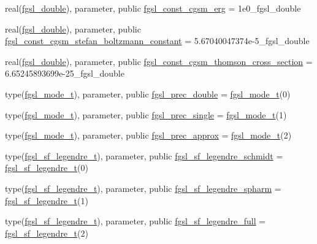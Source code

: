 \begin{DoxyCompactItemize}
real(\hyperlink{namespacefgsl_a9af5113378e0f000eb479d3f90196ddf}{fgsl\+\_\+double}), parameter, public \hyperlink{namespacefgsl_aa30f1017800c569944ad894fff2ae006}{fgsl\+\_\+const\+\_\+cgsm\+\_\+erg} = 1e0\+\_\+fgsl\+\_\+double
\item 
real(\hyperlink{namespacefgsl_a9af5113378e0f000eb479d3f90196ddf}{fgsl\+\_\+double}), parameter, public \hyperlink{namespacefgsl_a7b2b26a4a33ccd17f26be17db533b3ac}{fgsl\+\_\+const\+\_\+cgsm\+\_\+stefan\+\_\+boltzmann\+\_\+constant} = 5.\+67040047374e-\/5\+\_\+fgsl\+\_\+double
\item 
real(\hyperlink{namespacefgsl_a9af5113378e0f000eb479d3f90196ddf}{fgsl\+\_\+double}), parameter, public \hyperlink{namespacefgsl_a1581b093a3a9c09cff62c4bee45c1dcd}{fgsl\+\_\+const\+\_\+cgsm\+\_\+thomson\+\_\+cross\+\_\+section} = 6.\+65245893699e-\/25\+\_\+fgsl\+\_\+double
\item 
type(\hyperlink{structfgsl_1_1fgsl__mode__t}{fgsl\+\_\+mode\+\_\+t}), parameter, public \hyperlink{namespacefgsl_a974fb113c1c5dced8257e1eae0def683}{fgsl\+\_\+prec\+\_\+double} = \hyperlink{structfgsl_1_1fgsl__mode__t}{fgsl\+\_\+mode\+\_\+t}(0)
\item 
type(\hyperlink{structfgsl_1_1fgsl__mode__t}{fgsl\+\_\+mode\+\_\+t}), parameter, public \hyperlink{namespacefgsl_ac6801c472f4316aa060668c157db61bd}{fgsl\+\_\+prec\+\_\+single} = \hyperlink{structfgsl_1_1fgsl__mode__t}{fgsl\+\_\+mode\+\_\+t}(1)
\item 
type(\hyperlink{structfgsl_1_1fgsl__mode__t}{fgsl\+\_\+mode\+\_\+t}), parameter, public \hyperlink{namespacefgsl_ab6d5bd94526f9dacea9ce2293a66c824}{fgsl\+\_\+prec\+\_\+approx} = \hyperlink{structfgsl_1_1fgsl__mode__t}{fgsl\+\_\+mode\+\_\+t}(2)
\item 
type(\hyperlink{structfgsl_1_1fgsl__sf__legendre__t}{fgsl\+\_\+sf\+\_\+legendre\+\_\+t}), parameter, public \hyperlink{namespacefgsl_a8b170e3b737833743129ce02b48f23a9}{fgsl\+\_\+sf\+\_\+legendre\+\_\+schmidt} = \hyperlink{structfgsl_1_1fgsl__sf__legendre__t}{fgsl\+\_\+sf\+\_\+legendre\+\_\+t}(0)
\item 
type(\hyperlink{structfgsl_1_1fgsl__sf__legendre__t}{fgsl\+\_\+sf\+\_\+legendre\+\_\+t}), parameter, public \hyperlink{namespacefgsl_a13c5fa76fa6a114bff70b0d830517e5c}{fgsl\+\_\+sf\+\_\+legendre\+\_\+spharm} = \hyperlink{structfgsl_1_1fgsl__sf__legendre__t}{fgsl\+\_\+sf\+\_\+legendre\+\_\+t}(1)
\item 
type(\hyperlink{structfgsl_1_1fgsl__sf__legendre__t}{fgsl\+\_\+sf\+\_\+legendre\+\_\+t}), parameter, public \hyperlink{namespacefgsl_a8a929fa82ff6c96e5022ee2346fb2732}{fgsl\+\_\+sf\+\_\+legendre\+\_\+full} = \hyperlink{structfgsl_1_1fgsl__sf__legendre__t}{fgsl\+\_\+sf\+\_\+legendre\+\_\+t}(2)

\end{DoxyCompactItemize}
